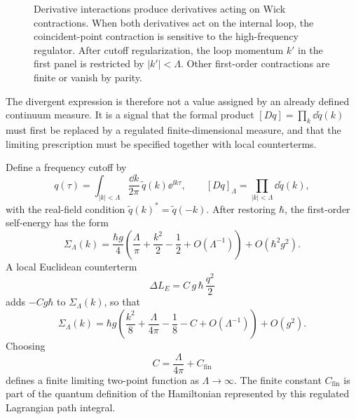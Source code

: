 \begin{figure}[H]
{
  }
  \caption{Derivative interactions produce derivatives acting on Wick
  contractions.  When both derivatives act on the internal loop, the
  coincident-point contraction is sensitive to the high-frequency regulator.
  After cutoff regularization, the loop momentum \(k'\) in the first panel is
  restricted by \(|k'|<\Lambda\).  Other first-order contractions are finite or
  vanish by parity.}
  \label{fig:volume-i-derivative-interaction-contractions}
\end{figure}

The divergent expression is therefore not a value assigned by an already
defined continuum measure.  It is a signal that the formal product
\([Dq]=\prod_k \dd\widetilde q(k)\) must first be replaced by a regulated
finite-dimensional measure, and that the limiting prescription must be
specified together with local counterterms.

Define a frequency cutoff by
\[
  q(\tau)
  =
  \int_{|k|<\Lambda}\frac{\dd k}{2\pi}\,
  \widetilde q(k)\ee^{\ii k\tau},
  \qquad
  [Dq]_\Lambda=\prod_{|k|<\Lambda}\dd \widetilde q(k),
\]
with the real-field condition \(\widetilde q(k)^*=\widetilde q(-k)\). After
restoring \(\hbar\), the first-order self-energy has the form
\[
  \Sigma_\Lambda(k)
  =
  \frac{\hbar g}{4}
  \left(
    \frac{\Lambda}{\pi}
    +\frac{k^2}{2}
    -\frac12
    +O(\Lambda^{-1})
  \right)
  +O(\hbar^2g^2).
\]
A local Euclidean counterterm
\[
  \Delta L_E=C\,g\,\hbar\,\frac{q^2}{2}
\]
adds \(-Cg\hbar\) to \(\Sigma_\Lambda(k)\), so that
\[
  \Sigma_\Lambda(k)
  =
  \hbar g
  \left(
    \frac{k^2}{8}
    +\frac{\Lambda}{4\pi}
    -\frac18
    -C
    +O(\Lambda^{-1})
  \right)
  +O(g^2).
\]
Choosing
\[
  C=\frac{\Lambda}{4\pi}+C_{\mathrm{fin}}
\]
defines a finite limiting two-point function as \(\Lambda\to\infty\). The
finite constant \(C_{\mathrm{fin}}\) is part of the quantum definition of the
Hamiltonian represented by this regulated Lagrangian path integral.

